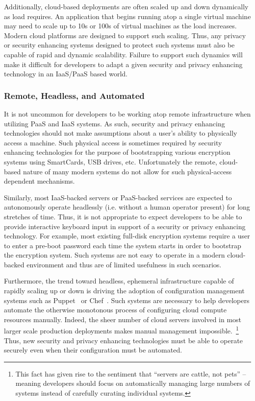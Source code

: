 Additionally, cloud-based deployments are often scaled up and down
dynamically as load requires. An application that begins running atop
a single virtual machine may need to scale up to 10s or 100s of
virtual machines as the load increases. Modern cloud platforms are
designed to support such scaling. Thus, any privacy or security
enhancing systems designed to protect such systems must also be
capable of rapid and dynamic scalability. Failure to support such
dynamics will make it difficult for developers to adapt a given
security and privacy enhancing technology in an IaaS/PaaS based world.

\subsubsection{Remote, Headless, and Automated}

It is not uncommon for developers to be working atop remote
infrastructure when utilizing PaaS and IaaS systems. As such, security
and privacy enhancing technologies should not make assumptions about a
user's ability to physically access a machine. Such physical access is
sometimes required by security enhancing technologies for the purpose
of bootstrapping various encryption systems using SmartCards, USB
drives, etc. Unfortunately the remote, cloud-based nature of many
modern systems do not allow for such physical-access dependent
mechanisms.

Similarly, most IaaS-backed servers or PaaS-backed services are
expected to autonomously operate headlessly (i.e. without a human
operator present) for long stretches of time. Thus, it is not
appropriate to expect developers to be able to provide interactive
keyboard input in support of a security or privacy enhancing
technology. For example, most existing full-disk encryption systems
require a user to enter a pre-boot password each time the system
starts in order to bootstrap the encryption system. Such systems are
not easy to operate in a modern cloud-backed environment and thus are
of limited usefulness in such scenarios.

Furthermore, the trend toward headless, ephemeral infrastructure
capable of rapidly scaling up or down is driving the adoption of
configuration management systems such as Puppet~\cite{puppet} or
Chef~\cite{chef}. Such systems are necessary to help developers
automate the otherwise monotonous process of configuring cloud compute
resources manually. Indeed, the sheer number of cloud servers involved
in most larger scale production deployments makes manual management
impossible.~\footnote{This fact has given rise to the sentiment that
  ``servers are cattle, not pets'' -- meaning developers should focus
  on automatically managing large numbers of systems instead of
  carefully curating individual systems.}  Thus, new security and
privacy enhancing technologies must be able to operate securely even
when their configuration must be automated.

